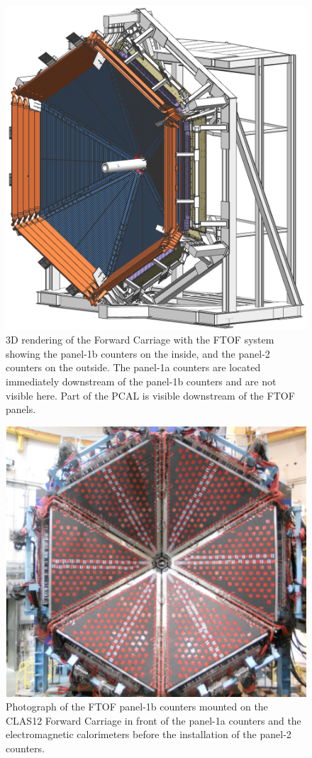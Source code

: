 \documentclass[final,3p,twocolumn]{elsarticle}
\begin{document}
\begin{figure}[t!]
\includegraphics[width=0.95\columnwidth]{fwd_carriage-1.png}
\caption{3D rendering of the Forward Carriage with the FTOF system showing the panel-1b counters on the
inside, and the panel-2 counters on the outside. The panel-1a counters are located immediately downstream of the
panel-1b counters and are not visible here. Part of the PCAL is visible downstream of the FTOF panels.}
\label{ftof-model}
\end{figure}
\begin{figure} [htp!]
\includegraphics[width=1.0\columnwidth]{FTOF-1b.png}
\caption{Photograph of the FTOF panel-1b counters mounted on the CLAS12 Forward Carriage in front of the
  panel-1a counters and the electromagnetic calorimeters before the installation of the panel-2 counters.} 
\label{ftof-1b}
\end{figure}
\end{document}
